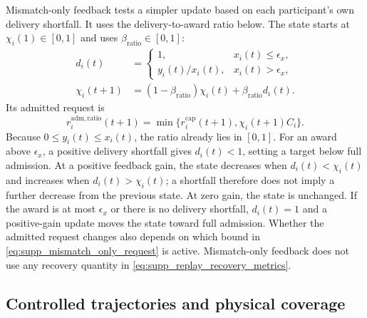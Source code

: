 \documentclass[11pt]{article}
\begin{document}
Mismatch-only feedback tests a simpler update based on each participant's own
delivery shortfall. It uses the delivery-to-award ratio below.
The state starts at $\chi_i(1)\in[0,1]$ and uses
$\beta_{\mathrm{ratio}}\in[0,1]$:
\begin{align}
d_i(t)&=
\begin{cases}
1,&x_i(t)\le\epsilon_x,\\
y_i(t)/x_i(t),&x_i(t)>\epsilon_x,
\end{cases}
\label{eq:supp_delivery_ratio}\\
\chi_i(t+1)&=(1-\beta_{\mathrm{ratio}})\chi_i(t)
+\beta_{\mathrm{ratio}}d_i(t).
\label{eq:supp_mismatch_only_update}
\end{align}
Its admitted request is
\begin{equation}
r_i^{\mathrm{adm,ratio}}(t+1)
=\min\{r_i^{\mathrm{cap}}(t+1),\chi_i(t+1)C_i\}.
\label{eq:supp_mismatch_only_request}
\end{equation}
Because $0\le y_i(t)\le x_i(t)$, the ratio already lies in $[0,1]$. For an award
above $\epsilon_x$, a positive delivery shortfall gives $d_i(t)<1$, setting a
target below full admission. At a positive feedback gain, the state decreases
when $d_i(t)<\chi_i(t)$ and increases when $d_i(t)>\chi_i(t)$; a shortfall
therefore does not imply a further decrease from the previous state. At zero
gain, the state is unchanged. If the award is at most $\epsilon_x$ or there is
no delivery shortfall, $d_i(t)=1$ and a positive-gain update moves the state
toward full admission. Whether the admitted
request changes also depends on which bound in
\eqref{eq:supp_mismatch_only_request} is active.
Mismatch-only feedback does not use any recovery quantity in
\eqref{eq:supp_replay_recovery_metrics}.

\subsection{Controlled trajectories and physical coverage}
\end{document}
